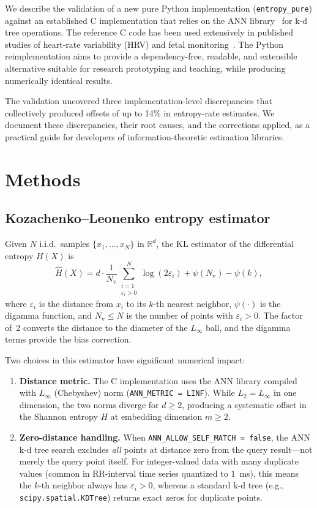 \documentclass[12pt,a4paper]{article}
\begin{document}
We describe the validation of a new pure Python implementation (\texttt{entropy\_pure}) against an established C implementation that relies on the ANN library~\citep{mount2010} for k-d tree operations.
The reference C code has been used extensively in published studies of heart-rate variability (HRV) and fetal monitoring~\citep{mayer2025}.
The Python reimplementation aims to provide a dependency-free, readable, and extensible alternative suitable for research prototyping and teaching, while producing numerically identical results.

The validation uncovered three implementation-level discrepancies that collectively produced offsets of up to 14\% in entropy-rate estimates.
We document these discrepancies, their root causes, and the corrections applied, as a practical guide for developers of information-theoretic estimation libraries.


\section{Methods}\label{sec:methods}

\subsection{Kozachenko--Leonenko entropy estimator}\label{sec:kl}

Given $N$ i.i.d.\ samples $\{x_1, \ldots, x_N\}$ in $\mathbb{R}^d$, the KL estimator of the differential entropy $H(X)$ is
\begin{equation}\label{eq:kl}
  \hat{H}(X) = d \cdot \frac{1}{N_{\mathrm{v}}} \sum_{\substack{i=1 \\ \varepsilon_i > 0}}^{N} \log(2\varepsilon_i)
  + \psi(N_{\mathrm{v}}) - \psi(k),
\end{equation}
where $\varepsilon_i$ is the distance from $x_i$ to its $k$-th nearest neighbor, $\psi(\cdot)$ is the digamma function, and $N_{\mathrm{v}} \leq N$ is the number of points with $\varepsilon_i > 0$.
The factor of~2 converts the distance to the diameter of the $L_\infty$ ball, and the digamma terms provide the bias correction.

Two choices in this estimator have significant numerical impact:
\begin{enumerate}
  \item \textbf{Distance metric.} The C implementation uses the ANN library compiled with $L_\infty$ (Chebyshev) norm (\texttt{ANN\_METRIC = LINF}).
  While $L_2 = L_\infty$ in one dimension, the two norms diverge for $d \geq 2$, producing a systematic offset in the Shannon entropy $H$ at embedding dimension $m \geq 2$.
  \item \textbf{Zero-distance handling.} When \texttt{ANN\_ALLOW\_SELF\_MATCH = false}, the ANN k-d tree search excludes \emph{all} points at distance zero from the query result---not merely the query point itself.
  For integer-valued data with many duplicate values (common in RR-interval time series quantized to \SI{1}{\milli\second}), this means the $k$-th neighbor always has $\varepsilon_i > 0$, whereas a standard k-d tree (e.g., \texttt{scipy.spatial.KDTree}) returns exact zeros for duplicate points.
\end{enumerate}
\end{document}
